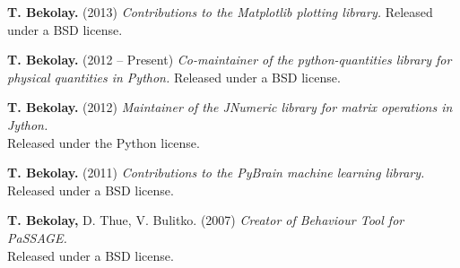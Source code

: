 \documentclass[line,margin]{res}
\begin{document}
\begin{resume}
\textbf{T. Bekolay.} (2013)
  {\sl Contributions to the Matplotlib plotting library.}
  Released under a BSD license.

\textbf{T. Bekolay.} (2012 -- Present)
  {\sl Co-maintainer of the python-quantities library for physical quantities
  in Python.} Released under a BSD license.

\textbf{T. Bekolay.} (2012)
  {\sl Maintainer of the JNumeric library for matrix operations in Jython.} \\
  Released under the Python license.

\textbf{T. Bekolay.} (2011)
  {\sl Contributions to the PyBrain machine learning library.} \\
  Released under a BSD license.

\textbf{T. Bekolay,} D. Thue, V. Bulitko. (2007)
  {\sl Creator of Behaviour Tool for PaSSAGE.} \\
  Released under a BSD license.

\label{LastPage}
\end{resume}
\end{document}
